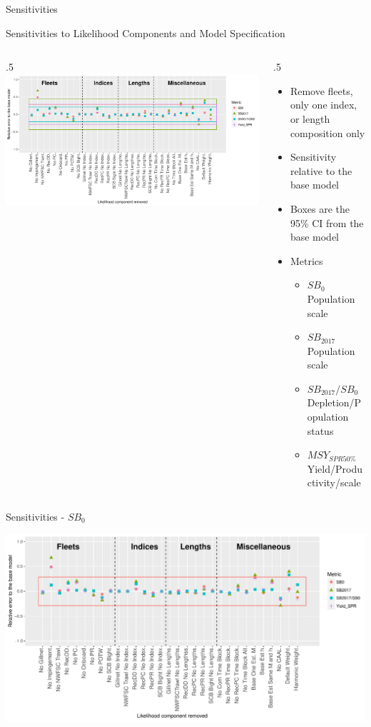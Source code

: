 \documentclass[ignorenonframetext,]{beamer}
\def\begincols{\begin{columns}}
\def\begincol{\begin{column}}
\def\endcol{\end{column}}
\def\endcols{\end{columns}}
\begin{document}
\begin{frame}{Sensitivities}

Sensitivities to Likelihood Components and Model Specification
\begincols
 \begincol{.5\textwidth} \includegraphics{Figures/Sensitivity_All.pdf}
\endcol
 \begincol{.5\textwidth}

\begin{itemize}
\item Remove fleets, only one index, or length composition only
\item Sensitivity relative to the base model
\item Boxes are the 95\% CI from the base model
\item Metrics
\begin{itemize}
\item $SB_0$ Population scale
\item $SB_{2017}$ Population scale
\item $SB_{2017}/SB_{0}$ Depletion/Population status
\item $MSY_{SPR50\%}$ Yield/Productivity/scale
\end{itemize}
\end{itemize}

\endcol
\endcols

\end{frame}

\begin{frame}{Sensitivities - \(SB_0\)}

\includegraphics{Figures/Sensitivity_SB0.pdf}

\end{frame}
\end{document}
